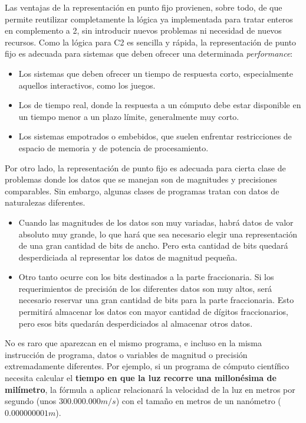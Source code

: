 \documentclass[spanish,A4,]{article}
\begin{document}
Las ventajas de la representación en punto fijo provienen, sobre todo,
de que permite reutilizar completamente la lógica ya implementada para
tratar enteros en complemento a 2, sin introducir nuevos problemas ni
necesidad de nuevos recursos. Como la lógica para C2 es sencilla y
rápida, la representación de punto fijo es adecuada para sistemas que
deben ofrecer una determinada \emph{performance}:

\begin{itemize}
\itemsep1pt\parskip0pt
\item
  Los sistemas que deben ofrecer un tiempo de respuesta corto,
  especialmente aquellos interactivos, como los juegos.
\item
  Los de tiempo real, donde la respuesta a un cómputo debe estar
  disponible en un tiempo menor a un plazo límite, generalmente muy
  corto.
\item
  Los sistemas empotrados o embebidos, que suelen enfrentar
  restricciones de espacio de memoria y de potencia de procesamiento.
\end{itemize}

Por otro lado, la representación de punto fijo es adecuada para cierta
clase de problemas donde los datos que se manejan son de magnitudes y
precisiones comparables. Sin embargo, algunas clases de programas tratan
con datos de naturalezas diferentes.

\begin{itemize}
\itemsep1pt\parskip0pt
\item
  Cuando las magnitudes de los datos son muy variadas, habrá datos de
  valor absoluto muy grande, lo que hará que sea necesario elegir una
  representación de una gran cantidad de bits de ancho. Pero esta
  cantidad de bits quedará desperdiciada al representar los datos de
  magnitud pequeña.\\
\item
  Otro tanto ocurre con los bits destinados a la parte fraccionaria. Si
  los requerimientos de precisión de los diferentes datos son muy altos,
  será necesario reservar una gran cantidad de bits para la parte
  fraccionaria. Esto permitirá almacenar los datos con mayor cantidad de
  dígitos fraccionarios, pero esos bits quedarán desperdiciados al
  almacenar otros datos.
\end{itemize}

No es raro que aparezcan en el mismo programa, e incluso en la misma
instrucción de programa, datos o variables de magnitud o precisión
extremadamente diferentes. Por ejemplo, si un programa de cómputo
científico necesita calcular el \textbf{tiempo en que la luz recorre una
millonésima de milímetro}, la fórmula a aplicar relacionará la velocidad
de la luz en metros por segundo (unos $300.000.000 m/s$) con el tamaño
en metros de un nanómetro ($0.000000001 m$).
\end{document}
